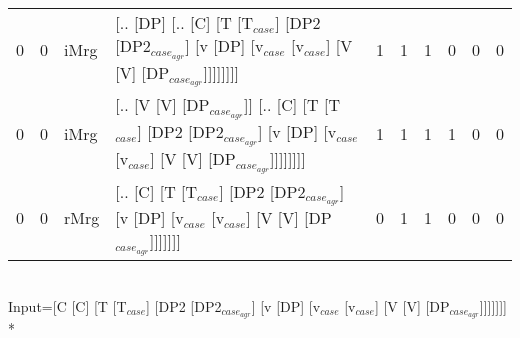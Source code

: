 \begin{tabularx}{\linewidth}{rrlXrrrrrr}
   0 &   0 & iMrg & [.. [DP] [.. [C] [T [T$_{case}$] [DP2 [DP2$_{case_{agr}}$] [v [DP] [v$_{case}$ [v$_{case}$] [V [V] [DP$_{case_{agr}}$]]]]]]]]                                                                               &            1 &             1 &             1 &                  0 &              0 &             0 \\
   0 &   0 & iMrg & [.. [V [V] [DP$_{case_{agr}}$]] [.. [C] [T [T$_{case}$] [DP2 [DP2$_{case_{agr}}$] [v [DP] [v$_{case}$ [v$_{case}$] [V [V] [DP$_{case_{agr}}$]]]]]]]]                                                              &            1 &             1 &             1 &                  1 &              0 &             0 \\
   0 &   0 & rMrg & [.. [C] [T [T$_{case}$] [DP2 [DP2$_{case_{agr}}$] [v [DP] [v$_{case}$ [v$_{case}$] [V [V] [DP$_{case_{agr}}$]]]]]]]                                                                                         &            0 &             1 &             1 &                  0 &              0 &             0 \\
\hline
\end{tabularx}\endgroup\\
\begingroup\scriptsize Input=[C [C] [T [T$_{case}$] [DP2 [DP2$_{case_{agr}}$] [v [DP] [v$_{case}$ [v$_{case}$] [V [V] [DP$_{case_{agr}}$]]]]]]]\\*
